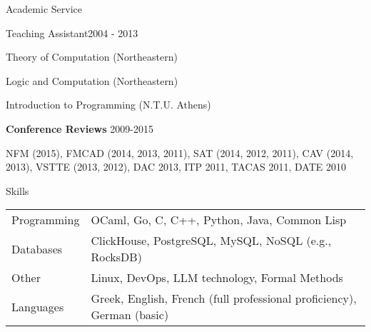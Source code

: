 \documentclass[11pt]{resume}
\begin{document}
\begin{rSection}{Academic Service}

  \begin{rSubsection}{Teaching Assistant}{2004 - 2013}{}{}
  \item Theory of Computation (Northeastern)
  \item Logic and Computation (Northeastern)
  \item Introduction to Programming (N.T.U. Athens)
  \end{rSubsection}

  \textbf{Conference Reviews} \hfill 2009-2015 %

  NFM (2015), FMCAD (2014, 2013, 2011), SAT (2014, 2012, 2011), CAV
  (2014, 2013), VSTTE (2013, 2012), DAC 2013, ITP 2011, TACAS 2011,
  DATE 2010

\end{rSection}

\begin{rSection}{Skills}

  \begin{tabular}{ll}
    Programming & OCaml, Go, C, C++, Python, Java, Common Lisp \\

    Databases & ClickHouse, PostgreSQL, MySQL, NoSQL (e.g., RocksDB) \\

    Other & Linux, DevOps, LLM technology, Formal Methods \\

    Languages & Greek, English, French (full professional
    proficiency), German (basic)
  \end{tabular}

\end{rSection}
\end{document}
